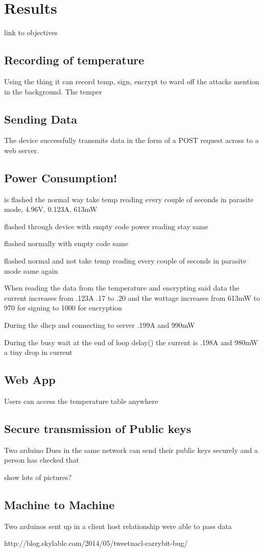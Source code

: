 \chapter{Results}
\label{res}

link to objectives

\section{Recording of temperature}

Using the thing it can record temp, sign, encrypt to ward off the attacks mention in the background. The temper

\section{Sending Data}

The device successfully transmits data in the form of a POST request across to a web server.

\section{Power Consumption!}

is flashed the normal way
take temp reading every couple of seconds in parasite mode, 
4.96V, 0.123A, 613mW

flashed through device with empty code
power reading stay same

flashed normally with empty code
same

flashed normal and not
take temp reading every couple of seconds in parasite mode
same again

When reading the data from the temperature and encrypting said data
the current increases from .123A  .17 to .20 and
the wattage increases from 613mW to 970 for signing to 1000 for encryption

During the dhcp and connecting to server .199A and 990mW

During the busy wait at the end of loop delay() the current is .198A and 980mW
a tiny drop in current

\section{Web App}

Users can access the temperature table anywhere 

\section{Secure transmission of Public keys}

Two arduino Dues in the same network can send their public keys securely and a person has checked that

show lots of pictures?

\section{Machine to Machine}

Two arduinos sent up in a client host relationship were able to pass data

http://blog.skylable.com/2014/05/tweetnacl-carrybit-bug/